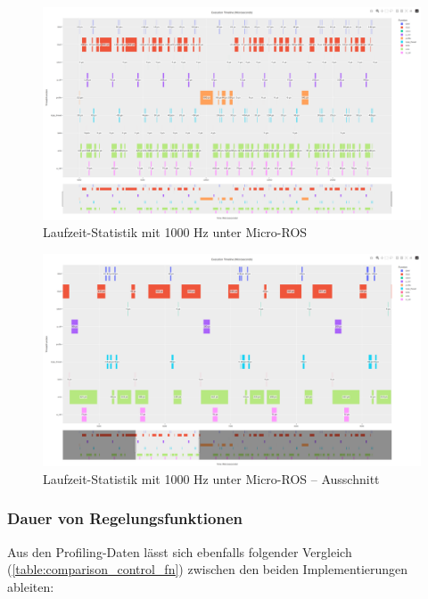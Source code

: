 \begin{figure}[H]
    \centering
    \includegraphics[width=1\textwidth]{assets/micro_ros_profiling_1000hz}
    \caption{Laufzeit-Statistik mit 1000 Hz unter Micro-ROS}
    \label{fig:uros_1000hz}
\end{figure}
\begin{figure}[H]
    \centering
    \includegraphics[width=1\textwidth]{assets/micro_ros_profiling_1000hz_ausschnitt}
    \caption{Laufzeit-Statistik mit 1000 Hz unter Micro-ROS -- Ausschnitt}
    \label{fig:uros_1000hz_section}
\end{figure}

\subsubsection{Dauer von Regelungsfunktionen}

Aus den Profiling-Daten lässt sich ebenfalls folgender Vergleich
(\ref{table:comparison_control_fn}) zwischen den beiden Implementierungen
ableiten:

